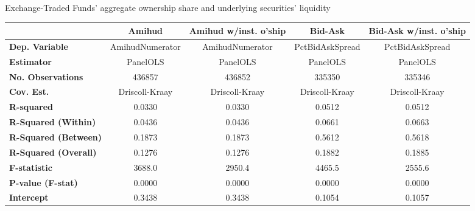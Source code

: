 \begin{center}
  \caption{Exchange-Traded Funds' aggregate ownership share and underlying securities' liquidity}
  \label{tab:Liquidity:Comp}
\begin{tabular}{lcccc}
\toprule
                                           &   \textbf{Amihud}   & \textbf{Amihud w/inst. o'ship} &   \textbf{Bid-Ask}  & \textbf{Bid-Ask w/inst. o'ship}  \\
\midrule
\textbf{Dep. Variable}                     &   AmihudNumerator   &        AmihudNumerator         &   PctBidAskSpread   &         PctBidAskSpread          \\
\textbf{Estimator}                         &       PanelOLS      &            PanelOLS            &       PanelOLS      &             PanelOLS             \\
\textbf{No. Observations}                  &        436857       &             436852             &        335350       &              335346              \\
\textbf{Cov. Est.}                         &    Driscoll-Kraay   &         Driscoll-Kraay         &    Driscoll-Kraay   &          Driscoll-Kraay          \\
\textbf{R-squared}                         &        0.0330       &             0.0330             &        0.0512       &              0.0512              \\
\textbf{R-Squared (Within)}                &        0.0436       &             0.0436             &        0.0661       &              0.0663              \\
\textbf{R-Squared (Between)}               &        0.1873       &             0.1873             &        0.5612       &              0.5618              \\
\textbf{R-Squared (Overall)}               &        0.1276       &             0.1276             &        0.1882       &              0.1885              \\
\textbf{F-statistic}                       &        3688.0       &             2950.4             &        4465.5       &              2555.6              \\
\textbf{P-value (F-stat)}                  &        0.0000       &             0.0000             &        0.0000       &              0.0000              \\
\midrule
\textbf{Intercept}                         &        0.3438       &             0.3438             &        0.1054       &              0.1057              \\

\end{tabular}
\end{center}
